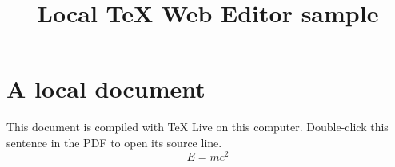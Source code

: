 \documentclass{article}
\title{Local TeX Web Editor sample}
\author{}
\date{}
\begin{document}
\maketitle
\section{A local document}
This document is compiled with TeX Live on this computer.
Double-click this sentence in the PDF to open its source line.
\[
  E = mc^2
\]
\end{document}
